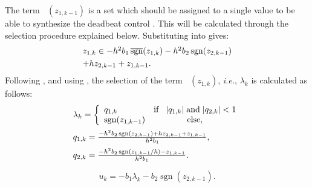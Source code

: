 \documentclass[lettersize,journal]{IEEEtran}
\DeclareMathOperator{\sgnsingle}{sgn}
\DeclareMathOperator{\sgnset}{\overline{sgn}}
\begin{document}
The term $\sgnset(z_{1,k-1})$ is a set which should be assigned to a single value to be able to synthesize the deadbeat control . This will be calculated through the selection procedure explained below. Substituting  into  gives:
\begin{equation}
\begin{array}{l}
z_{1,k} 
 \in -h^2b_1 \sgnset(z_{1,{k}})- 
h^2b_2\sgnsingle(z_{2,k-1}) \vspace{0.1cm} \\
+hz_{2,k-1} +z_{1,k-1} .
\end{array}
\label{E_closed_loop_x1}
\end{equation}
Following \cite{MOJALLIZADEH_Franklin}, and using , the selection of the term $\sgnset(z_{1,{k}})$, {\em i.e.}, $\lambda_k$ is calculated as follows:
\begin{equation}
\begin{array}{l}
\lambda_k=
\left \{
\begin{array}{lc}
q_{1,k}     &  \text{if} \hspace{0.3cm}  |q_{1,k}| \hspace{0.1cm} \text{and} \hspace{0.1cm} |q_{2,k}|<1   \\
 \sgnsingle(z_{1,k-1})    &   \text{else},
\end{array}
\right.  \vspace{0.2cm} \\ 
q_{1,k}=\frac{-h^2b_2\sgnsingle(z_{2,k-1})+hz_{2,k-1}+z_{1,k-1}}{h^2b_1} , \vspace{0.2cm} \\ 
q_{2,k}=\frac{-h^2b_2\sgnsingle(z_{1,k-1}/h)-z_{1,k-1}}{h^2b_1} .
\end{array}
\label{E_q}
\end{equation}


\begin{equation}
u_k = -b_1  \lambda_{k}
  -b_2\sgnsingle(z_{2,k-1}).\label{E_TC_discrete_control_explicit_solved} 
\end{equation}
\end{document}
